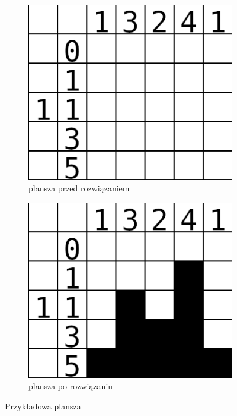 \begin{figure}[!htb]
    \centering
    \begin{subfigure}[b]{0.3\textwidth}
        \centering
        \includegraphics[width=\textwidth]{images/nonogram_example_empty.png}
        \caption{plansza przed rozwiązaniem}
    \end{subfigure}
    \begin{subfigure}[b]{0.3\textwidth}
        \centering
        \includegraphics[width=\textwidth]{images/nonogram_example_filled.png}
        \caption{plansza po rozwiązaniu}
    \end{subfigure}
    \caption{Przykładowa plansza}
\end{figure}


